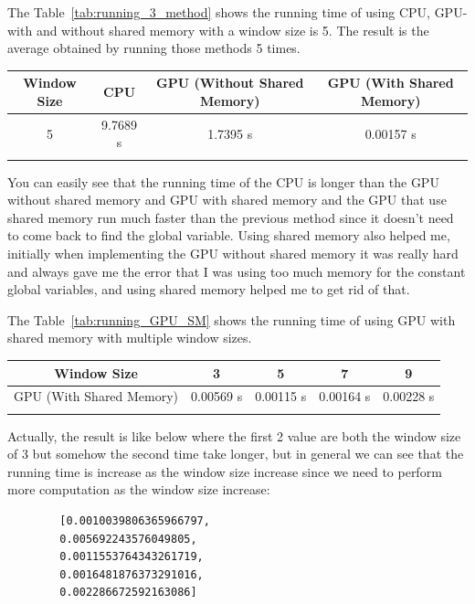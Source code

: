 \documentclass{article}
\begin{document}
	The Table~\ref{tab:running_3_method} shows the running time of using CPU, GPU-with and without shared memory with a window size is 5. The result is the average obtained by running those methods 5 times.
	
	\begin{tabular}{|c|c|c|c|}
		\hline
		Window Size & CPU & GPU (Without Shared Memory) & GPU (With Shared Memory) \\ \hline
		5 & 9.7689 s & 1.7395 s & 0.00157 s \\ \hline
		\label{tab:running_3_method}
	\end{tabular}
	
	You can easily see that the running time of the CPU is longer than the GPU without shared memory and GPU with shared memory and the GPU that use shared memory run much faster than the previous method since it doesn't need to come back to find the global variable. Using shared memory also helped me, initially when implementing the GPU without shared memory it was really hard and always gave me the error that I was using too much memory for the constant global variables, and using shared memory helped me to get rid of that.
	
	The Table~\ref{tab:running_GPU_SM} shows the running time of using GPU with shared memory with multiple window sizes.
	
	\begin{tabular}{|c|c|c|c|c|}
		\hline
		Window Size & 3 & 5 & 7 & 9 \\ \hline
		GPU (With Shared Memory) & 0.00569 s & 0.00115 s & 0.00164 s & 0.00228 s  \\ \hline
		\label{tab:running_3_method}
	\end{tabular}
	
	Actually, the result is like below where the first 2 value are both the window size of 3 but somehow the second time take longer, but in general we can see that the running time is increase as the window size increase since we need to perform more computation as the window size increase:
	\begin{verbatim}
		[0.0010039806365966797,
		0.005692243576049805,
		0.0011553764343261719,
		0.0016481876373291016,
		0.002286672592163086]
	\end{verbatim}
	
\end{document}
